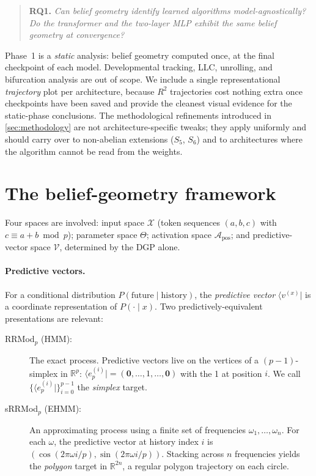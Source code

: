 \documentclass[11pt,a4paper]{article}
\begin{document}
\begin{quote}
\textbf{RQ1.} \emph{Can belief geometry identify learned algorithms model-agnostically? Do the transformer and the two-layer MLP exhibit the same belief geometry at convergence?}
\end{quote}

Phase~1 is a \emph{static} analysis: belief geometry computed once, at the final checkpoint of each model. Developmental tracking, LLC, unrolling, and bifurcation analysis are out of scope. We include a single representational \emph{trajectory} plot per architecture, because $R^2$ trajectories cost nothing extra once checkpoints have been saved and provide the cleanest visual evidence for the static-phase conclusions. The methodological refinements introduced in \cref{sec:methodology} are not architecture-specific tweaks; they apply uniformly and should carry over to non-abelian extensions ($S_5$, $S_6$) and to architectures where the algorithm cannot be read from the weights.

\section{The belief-geometry framework}\label{sec:framework}

Four spaces are involved: input space $\mathcal{X}$ (token sequences $(a, b, c)$ with $c \equiv a + b \bmod p$); parameter space $\Theta$; activation space $\mathcal{A}_{\mathrm{pos}}$; and predictive-vector space $\mathcal{V}$, determined by the DGP alone.

\paragraph{Predictive vectors.} For a conditional distribution $P(\mathrm{future} \mid \mathrm{history})$, the \emph{predictive vector} $\langle v^{(x)} |$ is a coordinate representation of $P(\cdot \mid x)$. Two predictively-equivalent presentations are relevant:

\begin{description}
    \item[RRMod$_p$ (HMM):] The exact process. Predictive vectors live on the vertices of a $(p-1)$-simplex in $\mathbb{R}^p$: $\langle e_p^{(i)} | = (\mathbf{0}, \ldots, 1, \ldots, \mathbf{0})$ with the 1 at position $i$. We call $\{\langle e_p^{(i)} |\}_{i=0}^{p-1}$ the \emph{simplex} target.
    \item[sRRMod$_p$ (EHMM):] An approximating process using a finite set of frequencies $\omega_1, \ldots, \omega_n$. For each $\omega$, the predictive vector at history index $i$ is $(\cos(2\pi\omega i/p), \sin(2\pi\omega i/p))$. Stacking across $n$ frequencies yields the \emph{polygon} target in $\mathbb{R}^{2n}$, a regular polygon trajectory on each circle.
\end{description}
\end{document}

